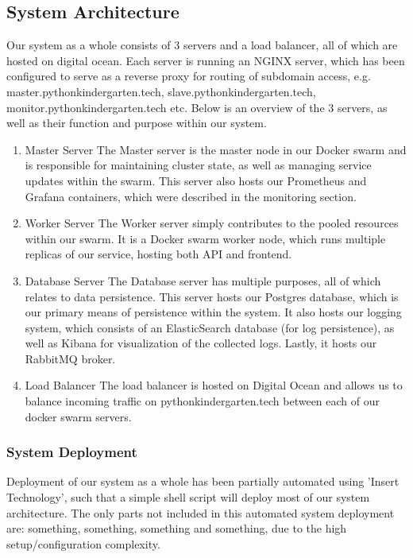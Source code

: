   \subsection{System Architecture}
  Our system as a whole consists of 3 servers and a load balancer, all of which are hosted on digital ocean.
  Each server is running an NGINX server, which has been configured to serve as a reverse proxy for routing of subdomain access, e.g. master.pythonkindergarten.tech, slave.pythonkindergarten.tech, monitor.pythonkindergarten.tech etc.
  \newline
  Below is an overview of the 3 servers, as well as their function and purpose within our system.\newline
  
  \begin{enumerate}
    \item Master Server\newline
    The Master server is the master node in our Docker swarm and is responsible for maintaining cluster state, as well as managing service updates within the swarm.
    This server also hosts our Prometheus and Grafana containers, which were described in the monitoring section.
    \item Worker Server\newline
    The Worker server simply contributes to the pooled resources within our swarm. 
    It is a Docker swarm worker node, which runs multiple replicas of our service, hosting both API and frontend.

    \item Database Server\newline
    The Database server has multiple purposes, all of which relates to data persistence.
    This server hosts our Postgres database, which is our primary means of persistence within the system. 
    \newline
    It also hosts our logging system, which consists of an ElasticSearch database (for log persistence), as well as Kibana for visualization of the collected logs.
    \newline
    Lastly, it hosts our RabbitMQ broker.
    \item Load Balancer\newline
    The load balancer is hosted on Digital Ocean and allows us to balance incoming traffic on pythonkindergarten.tech between each of our docker swarm servers.
  \end{enumerate}
  \subsubsection{System Deployment}
  Deployment of our system as a whole has been partially automated using 'Insert Technology', such that a simple shell script will deploy most of our system architecture.
  The only parts not included in this automated system deployment are: something, something, something and something, due to the high setup/configuration complexity.

